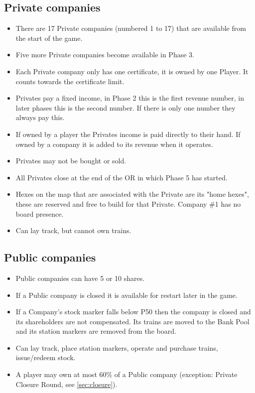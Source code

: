 \documentclass[a4paper,twocolumn]{article}
\begin{document}
\subsection{Private companies}
\begin{itemize}
	\item There are 17 Private companies (numbered 1 to 17) that are available
	from the start of the game.
	\item Five more Private companies become available in Phase 3.
	\item Each Private company only has one certificate, it is owned by one
	Player. It counts towards the certificate limit.
	\item Privates pay a fixed income, in Phase 2 this is the first revenue
	number, in later phases this is the second number. If there is only one
	number they always pay this.
	\item If owned by a player the Privates income is paid directly to their
	hand. If owned by a company it is added to its revenue when it operates.
	\item Privates may not be bought or sold.
	\item All Privates close at the end of the OR in which Phase 5 has started.
	\item Hexes on the map that are associated with the Private are its "home
	hexes", these are reserved and free to build for that Private. Company \#1
	has no board presence.
	\item Can lay track, but cannot own trains.
\end{itemize}

\subsection{Public companies}
\begin{itemize}
	\item Public companies can have 5 or 10 shares.
	\item If a Public company is closed it is available for restart later in the
	game.
	\item If a Company's stock marker falls below P50 then the company is closed
	and its shareholders are not compensated. Its trains are moved to the Bank
	Pool and its station markers are removed from the board.
	\item Can lay track, place station markers, operate and purchase trains,
	issue/redeem stock.
	\item A player may own at most 60\% of a Public company (exception: Private
	Closure Round, see \autoref{sec:closure}).
\end{itemize}
\end{document}
